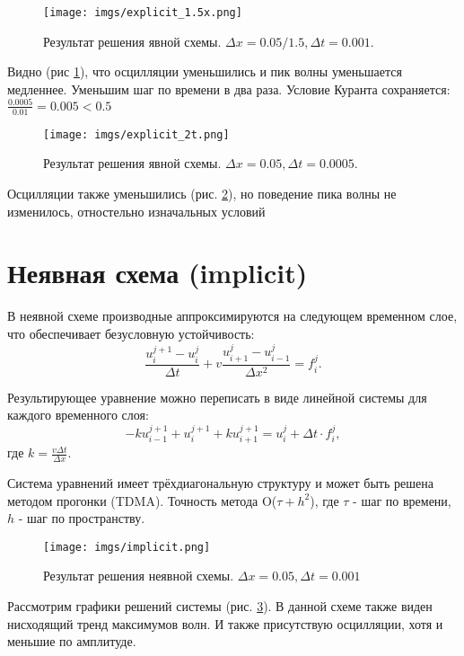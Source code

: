 \begin{figure}[h]  %
	\centering
	\texttt{[image: imgs/explicit\_1.5x.png]}  %
	\caption{Результат решения явной схемы. $\Delta x = 0.05 / 1.5, \Delta t = 0.001$.}  %
	\label{fig:explicit_1.5x}  %
\end{figure}
Видно (рис \ref{fig:explicit_1.5x}), что осцилляции уменьшились и пик волны уменьшается медленнее.
\newpage
Уменьшим шаг по времени в два раза. Условие Куранта сохраняется: $\frac{0.0005}{0.01} = 0.005 < 0.5$
\begin{figure}[h]  %
	\centering
	\texttt{[image: imgs/explicit\_2t.png]}  %
	\caption{Результат решения явной схемы. $\Delta x = 0.05 , \Delta t = 0.0005$.}  %
	\label{fig:explicit_2t}  %
\end{figure}

Осцилляции также уменьшились (рис. \ref{fig:explicit_2t}), но поведение пика волны не изменилось, отностельно изначальных условий
\newpage
\section{Неявная схема (implicit)}

В неявной схеме производные аппроксимируются на следующем временном слое, что обеспечивает безусловную устойчивость:
$$
	\frac{u_i^{j+1} - u_i^j}{\Delta t} + v \frac{u_{i +1}^j - u_{i-1}^j}{\Delta x^2} =  f_{i}^{j}.
$$

Результирующее уравнение можно переписать в виде линейной системы для каждого временного слоя:
$$
	- k u_{i-1}^{j+1} + u_i^{j+1} + k u_{i+1}^{j+1} = u_i^j+ \Delta t \cdot  f_{i}^{j},
$$
где $ k = \frac{v \Delta t}{ \Delta x}.$

Система уравнений имеет трёхдиагональную структуру и может быть решена методом прогонки (TDMA).
Точность метода O($\tau + h^2$), где $\tau$ - шаг по времени, $h$ - шаг по пространству.
\newline
\begin{figure}[h]  %
	\centering
	\texttt{[image: imgs/implicit.png]}  %
	\caption{Результат решения неявной схемы. $\Delta x = 0.05 , \Delta t = 0.001$}  %
	\label{fig:implicit}  %
\end{figure}
 
Рассмотрим графики решений системы (рис. \ref{fig:implicit}). В данной схеме также виден нисходящий тренд максимумов волн. И также присутствую осцилляции, хотя и меньшие по амплитуде.

